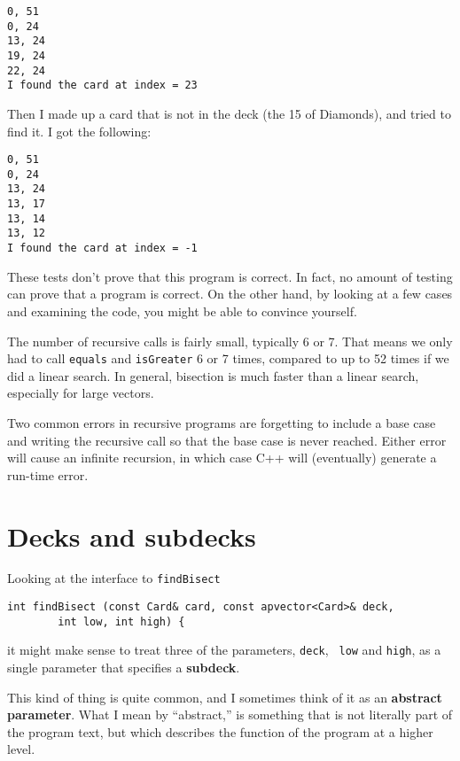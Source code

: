 \begin{verbatim}
0, 51
0, 24
13, 24
19, 24
22, 24
I found the card at index = 23
\end{verbatim}
%
Then I made up a card that is not in the deck (the 15 of Diamonds),
and tried to find it.  I got the following:

\begin{verbatim}
0, 51
0, 24
13, 24
13, 17
13, 14
13, 12
I found the card at index = -1
\end{verbatim}
%
These tests don't prove that this program is correct.  In fact, no
amount of testing can prove that a program is correct.  On the other
hand, by looking at a few cases and examining the code, you might be
able to convince yourself.


The number of recursive calls is fairly small, typically 6 or 7.  That
means we only had to call {\tt equals} and {\tt isGreater} 6 or 7
times, compared to up to 52 times if we did a linear search.  In
general, bisection is much faster than a linear search, especially for
large vectors.

Two common errors in recursive programs are forgetting to include a
base case and writing the recursive call so that the base case is never
reached.  Either error will cause an infinite recursion, in which case
C++ will (eventually) generate a run-time error.


\section{Decks and subdecks}

Looking at the interface to {\tt findBisect}

\begin{verbatim}
int findBisect (const Card& card, const apvector<Card>& deck,
		int low, int high) {
\end{verbatim}
%
it might make sense to treat three of the parameters, {\tt deck}, {\tt
low} and {\tt high}, as a single parameter that specifies a {\bf
subdeck}.


This kind of thing is quite common, and I sometimes think of it as an
{\bf abstract parameter}.  What I mean by ``abstract,'' is something
that is not literally part of the program text, but which describes the
function of the program at a higher level.

